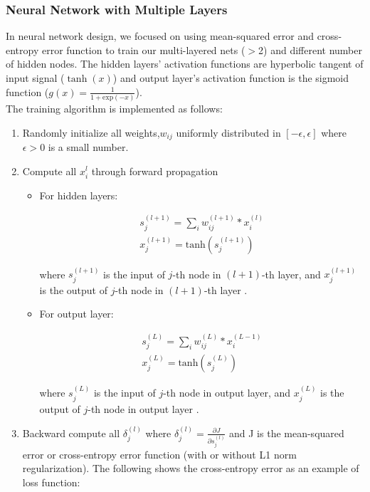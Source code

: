 \documentclass[conference]{IEEEtran}
\begin{document}
\subsubsection{ Neural Network with Multiple Layers}
In neural network design, we focused on using mean-squared error and cross-entropy error function to train our multi-layered nets ($>$2) and different number of hidden nodes. The hidden layers' activation functions are hyperbolic tangent of input signal ($\tanh{(x)}$) and output layer's activation function is the sigmoid function ($g(x)=\frac{1}{1+\text{exp}(-x)}$).\\
The training algorithm is implemented as follows:\\
\begin{enumerate}
\item Randomly initialize all weights,$w_{ij}$ uniformly distributed in $[-\epsilon,\epsilon]$ where $\epsilon>0$ is a small number.\\ 
\item Compute all $x_i^{l}$ through forward propagation\\
\begin{itemize}
\item For hidden layers:
\begin{center}
\begin{align}
s_j^{(l+1)} = \sum_{i}w_{ij}^{(l+1)}*x_i^{(l)}\\
x_j^{(l+1)} = \text{tanh}(s_j^{(l+1)})
\end{align}
\end{center}
where $s_j^{(l+1)}$ is the input of $j$-th node in $(l+1)$-th layer, and $x_j^{(l+1)}$ is the output of $j$-th node in $(l+1)$-th layer .\\
\item For output layer:
\begin{center}
\begin{align}
s_j^{(L)} = \sum_{i}w_{ij}^{(L)}*x_i^{(L-1)}\\
x_j^{(L)} = \text{tanh}(s_j^{(L)})
\end{align}
\end{center}
where $s_j^{(L)}$ is the input of $j$-th node in output layer, and $x_j^{(L)}$ is the output of $j$-th node in output layer .\\
\end{itemize}
\item Backward compute all $\delta_j^{(l)}$ where $\delta_j^{(l)}=\frac{\partial J}{\partial s_j^{(l)}}$ and J is the mean-squared error or cross-entropy error function (with or without L1 norm regularization). The following shows the cross-entropy error as an example of loss function:

\end{enumerate}
\end{document}
